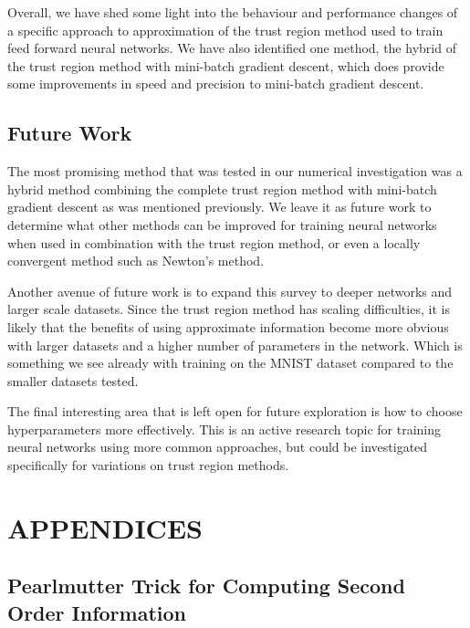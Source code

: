\documentclass[letterpaper,12pt,titlepage,oneside,final]{book}
\begin{document}
	Overall, we have shed some light into the behaviour and performance changes of a specific approach to approximation of the trust region method used to train feed forward neural networks. We have also identified one method, the hybrid of the trust region method with mini-batch gradient descent, which does provide some improvements in speed and precision to mini-batch gradient descent.
	

	\section{Future Work}
	
	The most promising method that was tested in our numerical investigation was a hybrid method combining the complete trust region method with mini-batch gradient descent as was mentioned previously. We leave it as future work to determine what other methods can be improved for training neural networks when used in combination with the trust region method, or even a locally convergent method such as Newton's method.
	
	Another avenue of future work is to expand this survey to deeper networks and larger scale datasets. Since the trust region method has scaling difficulties, it is likely that the benefits of using approximate information become more obvious with larger datasets and a higher number of parameters in the network. Which is something we see already with training on the MNIST dataset compared to the smaller datasets tested.
	
	The final interesting area that is left open for future exploration is how to choose hyperparameters more effectively. This is an active research topic for training neural networks using more common approaches, but could be investigated specifically for variations on trust region methods. 
	
	\appendix
	
	\chapter*{APPENDICES}
	\section{Pearlmutter Trick for Computing Second Order Information}
	
\end{document}
